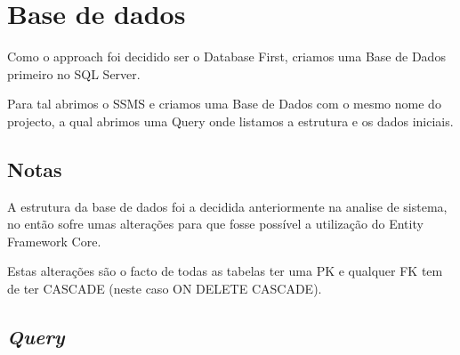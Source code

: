 \chapter{Base de dados}

Como o approach foi decidido ser o Database First, criamos uma Base de Dados primeiro no SQL Server.

Para tal abrimos o SSMS e criamos uma Base de Dados com o mesmo nome do projecto, a qual abrimos uma Query onde listamos a estrutura e os dados iniciais.

\section{Notas}

A estrutura da base de dados foi a decidida anteriormente na analise de sistema, no então sofre umas alterações para que fosse possível a utilização do Entity Framework Core.

Estas alterações são o facto de todas as tabelas ter uma PK e qualquer FK tem de ter CASCADE (neste caso ON DELETE CASCADE).

\section{\textit{Query}}


